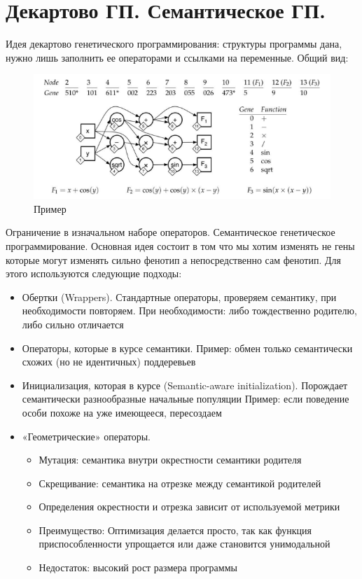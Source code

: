 \section{Декартово ГП. Семантическое ГП.}
Идея декартово генетического программирования: структуры программы дана, нужно лишь заполнить ее операторами и ссылками на переменные.
Общий вид:
\begin{figure}[h]
\centering
\includegraphics[width=0.8\linewidth]{images/decart.png}
\caption{Пример}
\label{fig:mpr}
\end{figure}
Ограничение в изначальном наборе операторов. 
Семантическое генетическое программирование. Основная идея состоит в том что мы хотим изменять не гены которые могут изменять сильно фенотип а непосредственно сам фенотип. 
Для этого используются следующие подходы:
\begin{itemize}
	\item Обертки (Wrappers). Стандартные операторы, проверяем семантику, при необходимости повторяем. При необходимости: либо тождественно родителю, либо сильно отличается
	\item Операторы, которые в курсе семантики. Пример: обмен только семантически схожих (но не идентичных) поддеревьев
	\item Инициализация, которая в курсе (Semantic-aware initialization). Порождает семантически разнообразные начальные популяции Пример: если поведение особи похоже на уже имеющееся, пересоздаем
	\item «Геометрические» операторы. 
	\begin{itemize}
		\item Мутация: семантика внутри окрестности семантики родителя
		\item Скрещивание: семантика на отрезке между семантикой родителей
		\item Определения окрестности и отрезка зависит от используемой метрики
		\item Преимущество: Оптимизация делается просто, так как функция приспособленности упрощается или даже становится унимодальной
		\item Недостаток: высокий рост размера программы
	\end{itemize}
\end{itemize}
